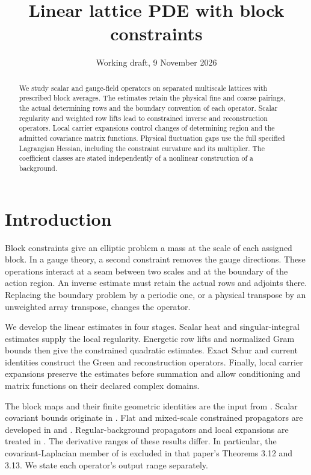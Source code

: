 \documentclass[11pt,letterpaper,reqno]{amsart}
\title[Linear lattice PDE]{Linear lattice PDE with block constraints}
\date{Working draft, 9 November 2026}
\numberwithin{equation}{section}
\theoremstyle{definition}
\theoremstyle{remark}
\begin{document}
\raggedbottom
\begin{abstract}
We study scalar and gauge-field operators on separated multiscale
lattices with prescribed block averages. The estimates retain the
physical fine and coarse pairings, the actual determining rows and
the boundary convention of each operator. Scalar regularity and
weighted row lifts lead to constrained inverse and reconstruction
operators. Local carrier expansions control changes of determining
region and the admitted covariance matrix functions. Physical
fluctuation gaps use the full specified Lagrangian Hessian, including
the constraint curvature and its multiplier. The coefficient classes
are stated independently of a nonlinear construction of a background.
\end{abstract}
\maketitle
\tableofcontents

\section{Introduction}

Block constraints give an elliptic problem a mass at the scale of
each assigned block. In a gauge theory, a second constraint removes
the gauge directions. These operations interact at a seam between
two scales and at the boundary of the action region. An inverse
estimate must retain the actual rows and adjoints there. Replacing
the boundary problem by a periodic one, or a physical transpose by
an unweighted array transpose, changes the operator.

We develop the linear estimates in four stages. Scalar heat and
singular-integral estimates supply the local regularity. Energetic
row lifts and normalized Gram bounds then give the constrained
quadratic estimates. Exact Schur and current identities construct
the Green and reconstruction operators. Finally, local carrier
expansions preserve the estimates before summation and allow
conditioning and matrix functions on their declared complex domains.

The block maps and their finite geometric identities are the input
from \cite{Averaging}. Scalar covariant bounds originate in
\cite[pp.~573--574]{Bal83}. Flat and mixed-scale constrained
propagators are developed in \cite[Sections D--F]{Bal84a} and
\cite[Sections A--C]{Bal84b}. Regular-background propagators and
local expansions are treated in \cite[Sections C--E]{Bal85p}.
The derivative ranges of these results differ. In particular,
the covariant-Laplacian member of \cite[eq.~(3.42)]{Bal85p}
is excluded in that paper's Theorems 3.12 and 3.13. We state each
operator's output range separately.
\end{document}
